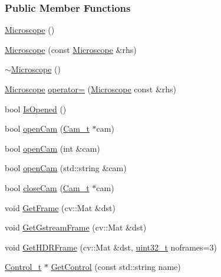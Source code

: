 \subsubsection*{Public Member Functions}
\begin{DoxyCompactItemize}
\item 
\hyperlink{class_hardware_1_1_microscope_a447e1c2d17d75090120b22ad6323de2a}{Microscope} ()
\item 
\hyperlink{class_hardware_1_1_microscope_a1f40641ce0c8dfc2611af33eeb985160}{Microscope} (const \hyperlink{class_hardware_1_1_microscope}{Microscope} \&rhs)
\item 
\hyperlink{class_hardware_1_1_microscope_afb6b20021157077feaf8df0e465a1f0e}{$\sim$\+Microscope} ()
\item 
\hyperlink{class_hardware_1_1_microscope}{Microscope} \hyperlink{class_hardware_1_1_microscope_ac8b63097048e3651bb6ba57ccb25e336}{operator=} (\hyperlink{class_hardware_1_1_microscope}{Microscope} const \&rhs)
\item 
bool \hyperlink{class_hardware_1_1_microscope_ae799dbdff39787d3226e8e8ce25386de}{Is\+Opened} ()
\item 
bool \hyperlink{class_hardware_1_1_microscope_a71ac92fc7c1cc19c7735a9c0b93b1eef}{open\+Cam} (\hyperlink{struct_hardware_1_1_microscope_1_1_cam__t}{Cam\+\_\+t} $\ast$cam)
\item 
bool \hyperlink{class_hardware_1_1_microscope_a7298405c4115400b8d949703b0bcad0c}{open\+Cam} (int \&cam)
\item 
bool \hyperlink{class_hardware_1_1_microscope_abd1bb8c3f37dac9f06b0d61cba98ac0a}{open\+Cam} (std\+::string \&cam)
\item 
bool \hyperlink{class_hardware_1_1_microscope_af59bbe16ae9efaaf05027ff35d900dee}{close\+Cam} (\hyperlink{struct_hardware_1_1_microscope_1_1_cam__t}{Cam\+\_\+t} $\ast$cam)
\item 
void \hyperlink{class_hardware_1_1_microscope_a1ec5c792320ae4db3f3b39830e74f880}{Get\+Frame} (cv\+::\+Mat \&dst)
\item 
void \hyperlink{class_hardware_1_1_microscope_aefd18afbdfca9ed200ad18e68bcfd340}{Get\+Gstream\+Frame} (cv\+::\+Mat \&dst)
\item 
void \hyperlink{class_hardware_1_1_microscope_a1287dba9130379a9e7d035eeaf47d059}{Get\+H\+D\+R\+Frame} (cv\+::\+Mat \&dst, \hyperlink{_soil_math_types_8h_a435d1572bf3f880d55459d9805097f62}{uint32\+\_\+t} noframes=3)
\item 
\hyperlink{struct_hardware_1_1_microscope_1_1_control__t}{Control\+\_\+t} $\ast$ \hyperlink{class_hardware_1_1_microscope_abc794f35d5b68458634507bf7e90e501}{Get\+Control} (const std\+::string name)

\end{DoxyCompactItemize}
